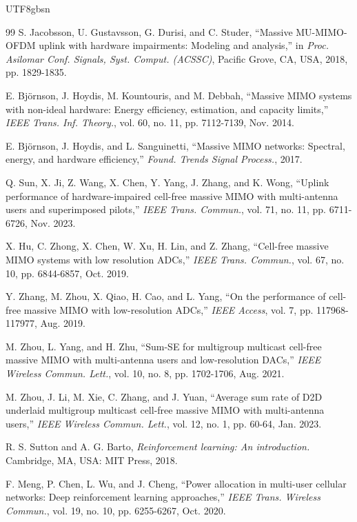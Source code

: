 \documentclass[lettersize,journal]{IEEEtran}
\begin{document}
\begin{CJK}{UTF8}{gbsn}
\begin{thebibliography}{99}
S. Jacobsson, U. Gustavsson, G. Durisi, and C. Studer, “Massive MU-MIMO-OFDM uplink with hardware impairments: Modeling and analysis,” in \textit{Proc. Asilomar Conf. Signals, Syst. Comput. (ACSSC)}, Pacific Grove, CA, USA, 2018, pp. 1829-1835.

E. Björnson, J. Hoydis, M. Kountouris, and M. Debbah, “Massive MIMO systems with non-ideal hardware: Energy efficiency, estimation, and capacity limits,” \textit{IEEE Trans. Inf. Theory.}, vol. 60, no. 11, pp. 7112-7139, Nov. 2014.

E. Björnson, J. Hoydis, and L. Sanguinetti, “Massive MIMO networks: Spectral, energy, and hardware efficiency,” \textit{Found. Trends Signal Process.}, 2017.

Q. Sun, X. Ji, Z. Wang, X. Chen, Y. Yang, J. Zhang, and K. Wong, “Uplink performance of hardware-impaired cell-free massive MIMO with multi-antenna users and superimposed pilots,” \textit{IEEE Trans. Commun.}, vol. 71, no. 11, pp. 6711-6726, Nov. 2023.

X. Hu, C. Zhong, X. Chen, W. Xu, H. Lin, and Z. Zhang, “Cell-free massive MIMO systems with low resolution ADCs,” \textit{IEEE Trans. Commun.}, vol. 67, no. 10, pp. 6844-6857, Oct. 2019.

Y. Zhang, M. Zhou, X. Qiao, H. Cao, and L. Yang, “On the performance of cell-free massive MIMO with low-resolution ADCs,” \textit{IEEE Access}, vol. 7, pp. 117968-117977, Aug. 2019.

M. Zhou, L. Yang, and H. Zhu, “Sum-SE for multigroup multicast cell-free massive MIMO with multi-antenna users and low-resolution DACs,” \textit{IEEE Wireless Commun. Lett.}, vol. 10, no. 8, pp. 1702-1706, Aug. 2021.

M. Zhou, J. Li, M. Xie, C. Zhang, and J. Yuan, “Average sum rate of D2D underlaid multigroup multicast cell-free massive MIMO with multi-antenna users,” \textit{IEEE Wireless Commun. Lett.}, vol. 12, no. 1, pp. 60-64, Jan. 2023.

R. S. Sutton and A. G. Barto, \textit{Reinforcement learning: An introduction.} Cambridge, MA, USA: MIT Press, 2018.

F. Meng, P. Chen, L. Wu, and J. Cheng, “Power allocation in multi-user cellular networks: Deep reinforcement learning approaches,” \textit{IEEE Trans. Wireless Commun.}, vol. 19, no. 10, pp. 6255-6267, Oct. 2020.


\end{thebibliography}
\end{CJK}
\end{document}
